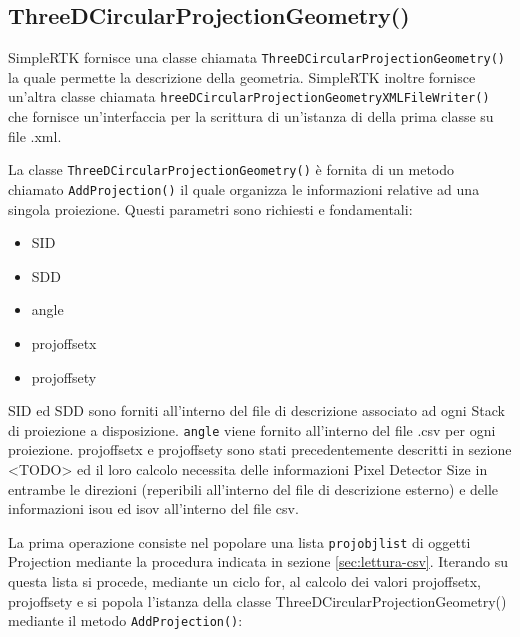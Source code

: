 \documentclass[a4paper,12pt, doubleside]{report}
\begin{document}
            \subsection{ThreeDCircularProjectionGeometry()}
                \par
                    SimpleRTK fornisce una classe chiamata \texttt{ThreeDCircularProjectionGeometry()} la quale permette la descrizione della geometria. SimpleRTK inoltre fornisce un'altra classe chiamata \texttt{hreeDCircularProjectionGeometryXMLFileWriter()} che fornisce un'interfaccia per la scrittura di un'istanza di della prima classe su file .xml.
                
                    La classe \texttt{ThreeDCircularProjectionGeometry()} è fornita di un metodo chiamato \texttt{AddProjection()} il quale organizza le informazioni relative ad una singola proiezione.
                    Questi parametri sono richiesti e fondamentali:
                    
                    \begin{itemize}
                        \item SID
                        \item SDD
                        \item angle
                        \item proj\textunderscore offset\textunderscore x
                        \item proj\textunderscore offset\textunderscore y
                    \end{itemize}
                \par
                    SID ed SDD sono forniti all'interno del file di descrizione associato ad ogni Stack di proiezione a disposizione. \texttt{angle} viene fornito all'interno del file .csv per ogni proiezione. 
                    proj\textunderscore offset\textunderscore x e proj\textunderscore offset\textunderscore y sono stati precedentemente descritti in sezione <TODO> ed il loro calcolo necessita delle informazioni Pixel Detector Size in entrambe le direzioni (reperibili all'interno del file di descrizione esterno) e delle informazioni iso\textunderscore u ed iso\textunderscore v all'interno del file csv.
                    
                    La prima operazione consiste nel popolare una lista \texttt{proj\textunderscore obj\textunderscore list} di oggetti Projection mediante la procedura indicata in sezione \ref{sec:lettura-csv}.
                    Iterando su questa lista si procede, mediante un ciclo for, al calcolo dei valori proj\textunderscore offset\textunderscore x, proj\textunderscore offset\textunderscore y e si popola l'istanza della classe ThreeDCircularProjectionGeometry() mediante il metodo \texttt{AddProjection()}:
                
\end{document}
